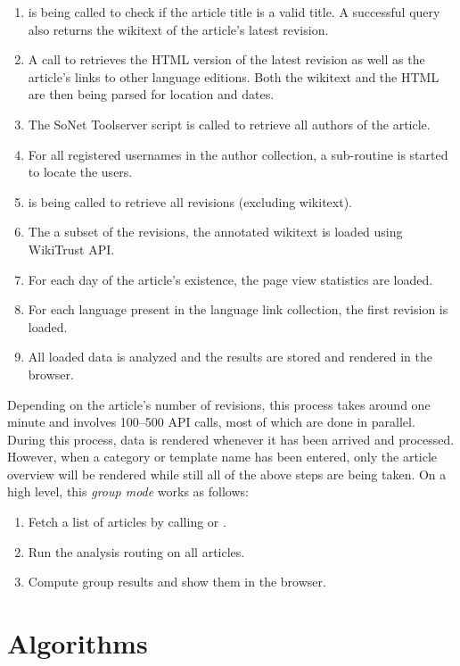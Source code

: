 \begin{enumerate}
	\item {} is being called to check if the article title is a valid title. 
	A successful query also returns the wikitext of the article's latest revision.
	\item A call to  retrieves the HTML version of the latest revision as well as the article's links to other language editions. 
	Both the wikitext and the HTML are then being parsed for location and dates.
	\item The SoNet Toolserver script is called to retrieve all authors of the article.
	\item For all registered usernames in the author collection, a sub-routine is started to locate the users. 
	\item {} is being called to retrieve all revisions (excluding wikitext). 
	\item The a subset of the revisions, the annotated wikitext is loaded using WikiTrust API.
	\item For each day of the article's existence, the page view statistics are loaded.
	\item For each language present in the language link collection, the first revision is loaded.
	\item All loaded data is analyzed and the results are stored and rendered in the browser.
\end{enumerate}

Depending on the article's number of revisions, this process takes around one minute and involves 100--500 API calls, most of which are done in parallel. 
During this process, data is rendered whenever it has been arrived and processed.
However, when a category or template name has been entered, only the article overview will be rendered while still all of the above steps are being taken.
On a high level, this \emph{group mode} works as follows:

\begin{enumerate}
    \item Fetch a list of articles by calling  or .
    \item Run the analysis routing on all articles.
    \item Compute group results and show them in the browser.
\end{enumerate}


\section{Algorithms}\label{sec:algorithms}

